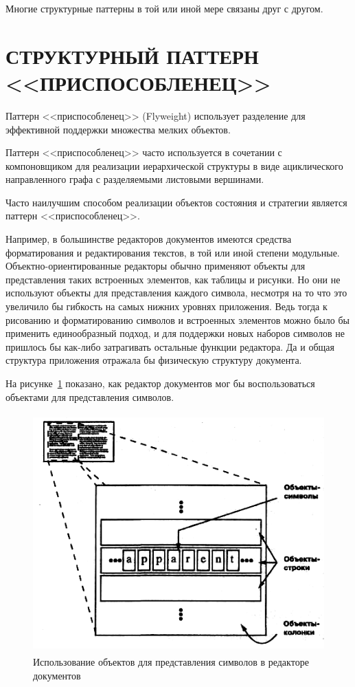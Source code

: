Многие структурные паттерны в той или иной мере связаны друг с другом.

\pagebreak

\section{СТРУКТУРНЫЙ ПАТТЕРН \\ <<ПРИСПОСОБЛЕНЕЦ>>}

Паттерн <<приспособленец>> (Flyweight) использует разделение для эффективной поддержки
множества мелких объектов.

Паттерн <<приспособленец>> часто используется в сочетании с компоновщиком
для реализации иерархической структуры в виде ациклического направленного
графа с разделяемыми листовыми вершинами.

Часто наилучшим способом реализации объектов состояния и стратегии 
является паттерн <<приспособленец>>.

Например, в большинстве редакторов документов имеются средства форматирования и
редактирования текстов, в той или иной степени модульные.
Объектно-ориентированные редакторы обычно применяют объекты для представления
таких встроенных элементов, как таблицы и рисунки.
Но они не используют объекты для представления каждого символа, несмотря на то что
это увеличило бы гибкость на самых нижних уровнях приложения.
Ведь тогда к рисованию и форматированию символов и встроенных элементов можно было
бы применить единообразный подход, и для поддержки новых наборов символов не пришлось бы
как-либо затрагивать остальные функции редактора.
Да и общая структура приложения отражала бы физическую структуру документа.

На рисунке~\ref{pic:text_processor_objs} показано, как редактор документов мог бы воспользоваться
объектами для представления символов.

\begin{figure}[htbp]
  \centering
  \includegraphics[width=150mm,height=92mm]{pic/text_processor_objs}
  \caption{Использование объектов для представления символов в редакторе документов}
  \label{pic:text_processor_objs}
\end{figure}


